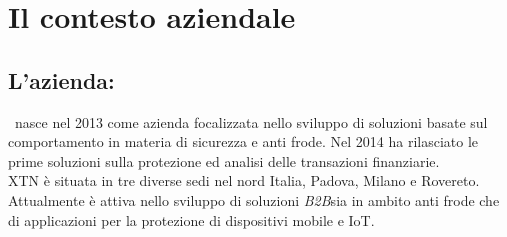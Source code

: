
\chapter{Il contesto aziendale}
\label{cap:processi-metodologie}

\section{L'azienda: \textbf{\azienda}}
\azienda\ nasce nel 2013 come azienda focalizzata nello sviluppo di soluzioni basate sul comportamento in materia di sicurezza e anti frode. Nel 2014 ha rilasciato le prime soluzioni sulla protezione ed analisi delle transazioni finanziarie.\\
XTN è situata in tre diverse sedi nel nord Italia, Padova, Milano e Rovereto. Attualmente è attiva  nello sviluppo di soluzioni \emph{B2B}\glsfirstoccur sia in ambito anti frode che di applicazioni per la protezione di dispositivi mobile e IoT.\\
  
